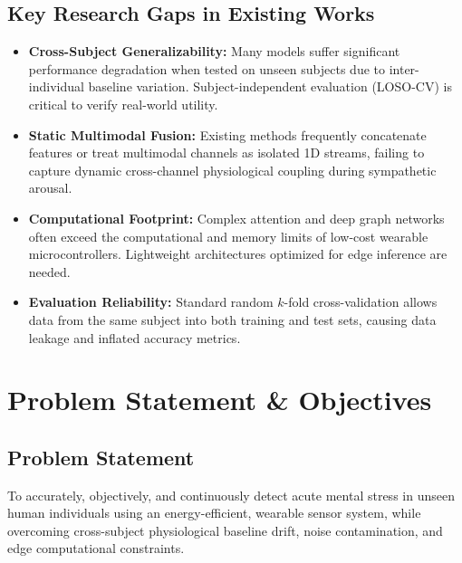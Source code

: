\documentclass[11pt,a4paper]{article}
\begin{document}
\subsection{Key Research Gaps in Existing Works}
\begin{itemize}
    \item \textbf{Cross-Subject Generalizability:} Many models suffer significant performance degradation when tested on unseen subjects due to inter-individual baseline variation. Subject-independent evaluation (LOSO-CV) is critical to verify real-world utility.
    \item \textbf{Static Multimodal Fusion:} Existing methods frequently concatenate features or treat multimodal channels as isolated 1D streams, failing to capture dynamic cross-channel physiological coupling during sympathetic arousal.
    \item \textbf{Computational Footprint:} Complex attention and deep graph networks often exceed the computational and memory limits of low-cost wearable microcontrollers. Lightweight architectures optimized for edge inference are needed.
    \item \textbf{Evaluation Reliability:} Standard random $k$-fold cross-validation allows data from the same subject into both training and test sets, causing data leakage and inflated accuracy metrics.
\end{itemize}

\section{Problem Statement \& Objectives}

\subsection{Problem Statement}
To accurately, objectively, and continuously detect acute mental stress in unseen human individuals using an energy-efficient, wearable sensor system, while overcoming cross-subject physiological baseline drift, noise contamination, and edge computational constraints.
\end{document}
